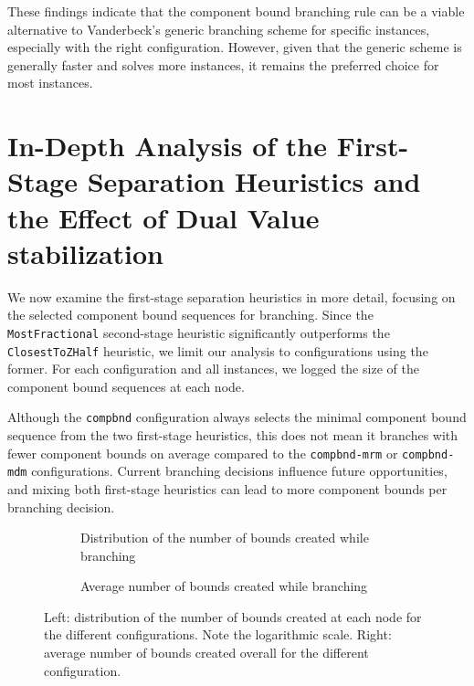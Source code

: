 These findings indicate that the component bound branching rule can be a viable alternative to Vanderbeck's generic branching scheme for specific instances, especially with the right configuration. However, given that the generic scheme is generally faster and solves more instances, it remains the preferred choice for most instances.

\section{In-Depth Analysis of the First-Stage Separation Heuristics and the Effect of Dual Value stabilization}\label{sec:evaluation_comparison_separation_firststage}
We now examine the first-stage separation heuristics in more detail, focusing on the selected component bound sequences for branching. Since the \texttt{MostFractional} second-stage heuristic significantly outperforms the \texttt{ClosestToZHalf} heuristic, we limit our analysis to configurations using the former. For each configuration and all instances, we logged the size of the component bound sequences at each node.

Although the \texttt{compbnd} configuration always selects the minimal component bound sequence from the two first-stage heuristics, this does not mean it branches with fewer component bounds on average compared to the \texttt{compbnd-mrm} or \texttt{compbnd-mdm} configurations. Current branching decisions influence future opportunities, and mixing both first-stage heuristics can lead to more component bounds per branching decision.

\begin{figure}
	\centering

	\begin{subfigure}{0.495\textwidth}
		\centering
		
		\caption{Distribution of the number of bounds created while branching}
		\label{fig:compbnd_num_bounds}
	\end{subfigure}
	\hfill
	\begin{subfigure}{0.495\textwidth}
		\centering
		
		\caption{Average number of bounds created while branching}
		\label{fig:compbnd_avg_num_bounds}
	\end{subfigure}

	\caption{Left: distribution of the number of bounds created at each node for the different configurations. Note the logarithmic scale. Right: average number of bounds created overall for the different configuration.}
	\label{fig:comparison_bounds}
\end{figure}

